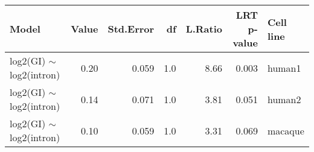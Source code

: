 \begin{table}[ht]
\centering
\begin{tabular}{lrrrrrl}
  \hline
Model & Value & Std.Error & df & L.Ratio & LRT p-value & Cell line \\ 
  \hline
log2(GI) $\sim$ log2(intron) & 0.20 & 0.059 & 1.0 & 8.66 & 0.003 & human1 \\ 
  log2(GI) $\sim$ log2(intron) & 0.14 & 0.071 & 1.0 & 3.81 & 0.051 & human2 \\ 
  log2(GI) $\sim$ log2(intron) & 0.10 & 0.059 & 1.0 & 3.31 & 0.069 & macaque \\ 
   \hline
\end{tabular}
\end{table}
